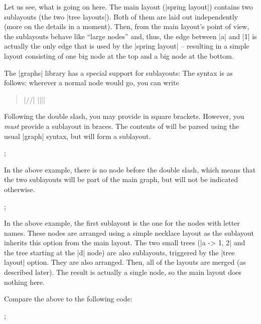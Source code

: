 Let us see, what is going on here. The main layout (|spring layout|) contains
two sublayouts (the two |tree layouts|). Both of them are laid out
independently (more on the details in a moment). Then, from the main layout's
point of view, the sublayouts behave like ``large nodes'' and, thus, the edge
between |a| and |1| is actually the only edge that is used by the
|spring layout| -- resulting in a simple layout consisting of one big node at
the top and a big node at the bottom.

The |graphs| library has a special support for sublayouts: The syntax is as
follows: wherever a normal node would go, you can write
%
\begin{quote}
    |//|  |{||}|
\end{quote}

Following the double slash, you may provide  in square
brackets. However, you \emph{must} provide a sublayout in braces. The contents
of  will be parsed using the usual |graph| syntax, but will
form a sublayout.
%
\begin{codeexample}[]
\tikz {};
\end{codeexample}

In the above example, there is no node before the double slash, which means
that the two sublayouts will be part of the main graph, but will not be
indicated otherwise.
%
\begin{codeexample}[]
\tikz {};
\end{codeexample}

In the above example, the first sublayout is the one for the nodes with letter
names. These nodes are arranged using a simple necklace layout as the sublayout
inherits this option from the main layout. The two small trees (|a -> {1, 2}|
and the tree starting at the |d| node) are also sublayouts, triggered by the
|tree layout| option. They are also arranged. Then, all of the layouts are
merged (as described later). The result is actually a single node, so the main
layout does nothing here.

Compare the above to the following code:
%
\begin{codeexample}[]
\tikz {};
\end{codeexample}


